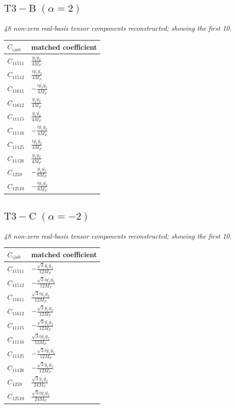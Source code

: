 \documentclass[9pt]{article}
\begin{document}
\subsection*{$ \mathrm{T3-B}\;(\alpha=2) $}
\textit{48 non-zero real-basis tensor components reconstructed; showing the first 10.}
\begin{longtable}{@{}ll@{}}
\toprule
$C_{ijab}$ & matched coefficient \\
\midrule
$C_{11511}$ & $ \frac{\overline{y_{1}} \overline{y_{2}}}{4 M_F} $ \\
$C_{11512}$ & $ \frac{i \overline{y_{1}} \overline{y_{2}}}{4 M_F} $ \\
$C_{11611}$ & $ - \frac{i \overline{y_{1}} \overline{y_{2}}}{4 M_F} $ \\
$C_{11612}$ & $ \frac{\overline{y_{1}} \overline{y_{2}}}{4 M_F} $ \\
$C_{11115}$ & $ \frac{\overline{y_{1}} \overline{y_{2}}}{4 M_F} $ \\
$C_{11116}$ & $ - \frac{i \overline{y_{1}} \overline{y_{2}}}{4 M_F} $ \\
$C_{11125}$ & $ \frac{i \overline{y_{1}} \overline{y_{2}}}{4 M_F} $ \\
$C_{11126}$ & $ \frac{\overline{y_{1}} \overline{y_{2}}}{4 M_F} $ \\
$C_{1259}$ & $ - \frac{\overline{y_{1}} \overline{y_{2}}}{8 M_F} $ \\
$C_{12510}$ & $ - \frac{i \overline{y_{1}} \overline{y_{2}}}{8 M_F} $ \\
\bottomrule
\end{longtable}
\subsection*{$ \mathrm{T3-C}\;(\alpha=-2) $}
\textit{48 non-zero real-basis tensor components reconstructed; showing the first 10.}
\begin{longtable}{@{}ll@{}}
\toprule
$C_{ijab}$ & matched coefficient \\
\midrule
$C_{11511}$ & $ - \frac{\sqrt{3} \overline{y_{1}} \overline{y_{2}}}{12 M_F} $ \\
$C_{11512}$ & $ - \frac{\sqrt{3} i \overline{y_{1}} \overline{y_{2}}}{12 M_F} $ \\
$C_{11611}$ & $ \frac{\sqrt{3} i \overline{y_{1}} \overline{y_{2}}}{12 M_F} $ \\
$C_{11612}$ & $ - \frac{\sqrt{3} \overline{y_{1}} \overline{y_{2}}}{12 M_F} $ \\
$C_{11115}$ & $ - \frac{\sqrt{3} \overline{y_{1}} \overline{y_{2}}}{12 M_F} $ \\
$C_{11116}$ & $ \frac{\sqrt{3} i \overline{y_{1}} \overline{y_{2}}}{12 M_F} $ \\
$C_{11125}$ & $ - \frac{\sqrt{3} i \overline{y_{1}} \overline{y_{2}}}{12 M_F} $ \\
$C_{11126}$ & $ - \frac{\sqrt{3} \overline{y_{1}} \overline{y_{2}}}{12 M_F} $ \\
$C_{1259}$ & $ \frac{\sqrt{3} \overline{y_{1}} \overline{y_{2}}}{24 M_F} $ \\
$C_{12510}$ & $ \frac{\sqrt{3} i \overline{y_{1}} \overline{y_{2}}}{24 M_F} $ \\
\bottomrule
\end{longtable}
\end{document}
